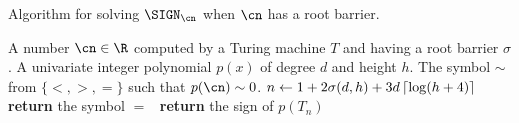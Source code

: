 \begin{algorithm}[t]
  \caption{Algorithm for solving $\SIGN_{\cn}$ when $\cn$ has a root barrier.}
  \label{algo:sign-evaluation}
  \begin{algorithmic}[1]
    \Fixed \tab A number $\cn \in \R$ computed by a Turing machine $T$ and having a root barrier $\sigma$.
    \Require \tab A univariate integer polynomial $p(x)$ of degree $d$ and height $h$.
    \Ensure \tab The symbol $\sim$ from $\{<,>,=\}$ such that $p(\cn) \sim 0$.
    \medskip
    \State $n \gets 1 + 2 \sigma(d,h) + 3 d\left\lceil\log(h+4)\right\rceil$ 
      \label{algo:sign-evaluation:bound-on-n}
      \textbf{return} the symbol $=$
      \label{algo:sign-evaluation:small-pTn}
    \Else \
      \textbf{return} the sign of $p(T_n)$
      \label{algo:sign-evaluation:large-pTn}
    \EndIf 
  \end{algorithmic}
\end{algorithm}%

